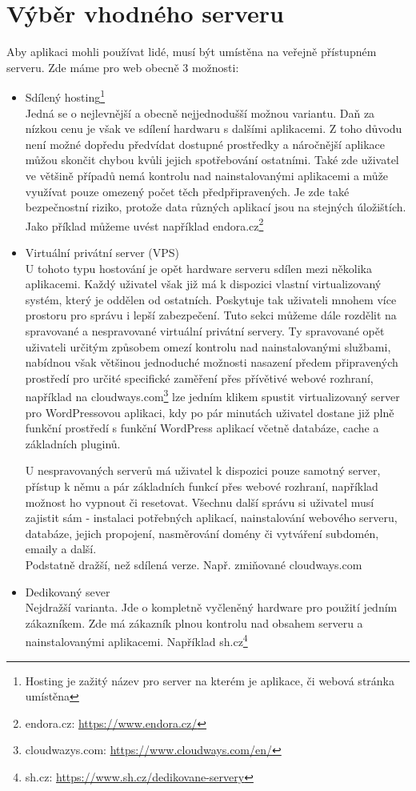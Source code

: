 \section{Výběr vhodného serveru}
Aby aplikaci mohli používat lidé, musí být umístěna na veřejně přístupném serveru. Zde máme pro web obecně 3 možnosti:
\begin{itemize}
    \item Sdílený hosting\footnote{Hosting je zažitý název pro server na kterém je aplikace, či webová stránka umístěna}\\
    Jedná se o nejlevnější a obecně nejjednodušší možnou variantu. Daň za nízkou cenu je však ve sdílení hardwaru s dalšími aplikacemi. Z toho důvodu není možné dopředu předvídat dostupné prostředky a náročnější aplikace můžou skončit chybou kvůli jejich spotřebování ostatními. Také zde uživatel ve většině případů nemá kontrolu nad nainstalovanými aplikacemi a může využívat pouze omezený počet těch předpřipravených. Je zde také bezpečnostní riziko, protože data různých aplikací jsou na stejných úložištích. Jako příklad můžeme uvést například endora.cz\footnote{endora.cz: \url{https://www.endora.cz/}}
    \item Virtuální privátní server (VPS)\\
    U tohoto typu hostování je opět hardware serveru sdílen mezi několika aplikacemi. Každý uživatel však již má k dispozici vlastní virtualizovaný systém, který je oddělen od ostatních. Poskytuje tak uživateli mnohem více prostoru pro správu i lepší zabezpečení.
    Tuto sekci můžeme dále rozdělit na spravované a nespravované virtuální privátní servery. Ty spravované opět uživateli určitým způsobem omezí kontrolu nad nainstalovanými službami, nabídnou však většinou jednoduché možnosti nasazení předem připravených prostředí pro určité specifické zaměření přes přívětivé webové rozhraní, například na cloudways.com\footnote{cloudwazys.com: \url{https://www.cloudways.com/en/}} lze jedním klikem spustit virtualizovaný server pro WordPressovou aplikaci, kdy po pár minutách uživatel dostane již plně funkční prostředí s funkční WordPress aplikací včetně databáze, cache a základních pluginů.\par
    U nespravovaných serverů má uživatel k dispozici pouze samotný server, přístup k němu a pár základních funkcí přes webové rozhraní, například možnost ho vypnout či resetovat. Všechnu další správu si uživatel musí zajistit sám - instalaci potřebných aplikací, nainstalování webového serveru, databáze, jejich propojení, nasměrování domény či vytváření subdomén, emaily a další.\\
    Podstatně dražší, než sdílená verze. Např. zmiňované cloudways.com
    \item Dedikovaný sever\\
    Nejdražší varianta. Jde o kompletně vyčleněný hardware pro použití jedním zákazníkem. Zde má zákazník plnou kontrolu nad obsahem serveru a nainstalovanými aplikacemi. Například sh.cz\footnote{sh.cz: \url{https://www.sh.cz/dedikovane-servery}}
\end{itemize}

